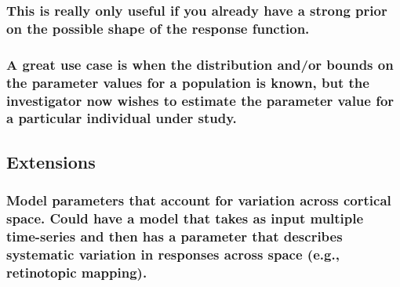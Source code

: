 \documentclass[
  english,
  man,floatsintext]{apa6}
\begin{document}
\hypertarget{this-is-really-only-useful-if-you-already-have-a-strong-prior-on-the-possible-shape-of-the-response-function.}{%
\subsubsection{This is really only useful if you already have a strong prior on the possible shape of the response function.}\label{this-is-really-only-useful-if-you-already-have-a-strong-prior-on-the-possible-shape-of-the-response-function.}}

\hypertarget{a-great-use-case-is-when-the-distribution-andor-bounds-on-the-parameter-values-for-a-population-is-known-but-the-investigator-now-wishes-to-estimate-the-parameter-value-for-a-particular-individual-under-study.}{%
\subsubsection{A great use case is when the distribution and/or bounds on the parameter values for a population is known, but the investigator now wishes to estimate the parameter value for a particular individual under study.}\label{a-great-use-case-is-when-the-distribution-andor-bounds-on-the-parameter-values-for-a-population-is-known-but-the-investigator-now-wishes-to-estimate-the-parameter-value-for-a-particular-individual-under-study.}}

\hypertarget{extensions}{%
\subsection{Extensions}\label{extensions}}

\hypertarget{model-parameters-that-account-for-variation-across-cortical-space.-could-have-a-model-that-takes-as-input-multiple-time-series-and-then-has-a-parameter-that-describes-systematic-variation-in-responses-across-space-e.g.-retinotopic-mapping.}{%
\subsubsection{Model parameters that account for variation across cortical space. Could have a model that takes as input multiple time-series and then has a parameter that describes systematic variation in responses across space (e.g., retinotopic mapping).}\label{model-parameters-that-account-for-variation-across-cortical-space.-could-have-a-model-that-takes-as-input-multiple-time-series-and-then-has-a-parameter-that-describes-systematic-variation-in-responses-across-space-e.g.-retinotopic-mapping.}}
\end{document}
